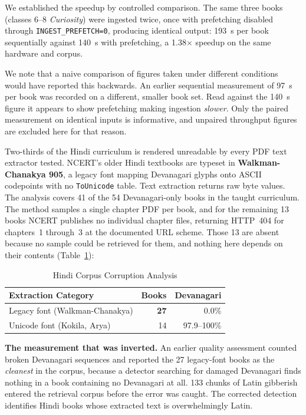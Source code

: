 \ifspringer\else
We established the speedup by controlled comparison. The same three books (classes 6--8 \textit{Curiosity}) were ingested twice, once with prefetching disabled through \texttt{INGEST\_PREFETCH=0}, producing identical output: 193~s per book sequentially against 140~s with prefetching, a 1.38$\times$ speedup on the same hardware and corpus.
\fi

\ifshort\else  %
We note that a naive comparison of figures taken under different conditions would have reported this backwards. An earlier sequential measurement of 97~s per book was recorded on a different, smaller book set. Read against the 140~s figure it appears to show prefetching making ingestion \textit{slower}. Only the paired measurement on identical inputs is informative, and unpaired throughput figures are excluded here for that reason.
\fi

\label{sec:legacy}
Two-thirds of the Hindi curriculum is rendered unreadable by every PDF text extractor tested. NCERT's older Hindi textbooks are typeset in \textbf{Walkman-Chanakya 905}, a legacy font mapping Devanagari glyphs onto ASCII codepoints with no \texttt{ToUnicode} table. Text extraction returns raw byte values. The analysis covers 41 of the 54 Devanagari-only books in the taught curriculum. The method samples a single chapter PDF per book, and for the remaining 13 books NCERT publishes no individual chapter files, returning HTTP~404 for chapters~1 through~3 at the documented URL scheme. Those 13 are absent because no sample could be retrieved for them, and nothing here depends on their contents (Table~\ref{tab:legacy}):

\begin{table}
\caption{Hindi Corpus Corruption Analysis}
\label{tab:legacy}
\centering
\begin{tabular}{@{}lrr@{}}
\toprule
\textbf{Extraction Category} & \textbf{Books} & \textbf{Devanagari} \\
\midrule
Legacy font (Walkman-Chanakya) & \textbf{27} & 0.0\% \\
Unicode font (Kokila, Arya) & 14 & 97.9--100\% \\
\bottomrule
\end{tabular}
\end{table}

\ifshort\else  %
\textbf{The measurement that was inverted.} An earlier quality assessment counted broken Devanagari sequences and reported the 27 legacy-font books as the \textit{cleanest} in the corpus, because a detector searching for damaged Devanagari finds nothing in a book containing no Devanagari at all. 133 chunks of Latin gibberish entered the retrieval corpus before the error was caught. The corrected detection identifies Hindi books whose extracted text is overwhelmingly Latin.
\fi

